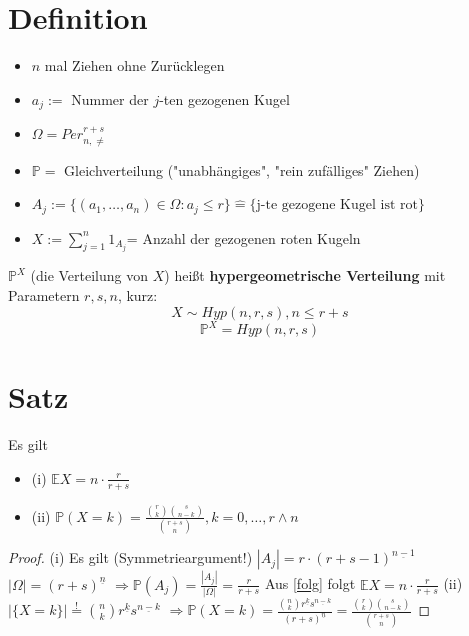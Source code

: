 \documentclass[a4paper,11pt,notitlepage]{report}
\newcommand{\Prim}{{\ensuremath{\mathbb{P}}}}
\newcommand{\E}{{\ensuremath{\mathbb{E}}}}
\begin{document}
\section{Definition}
\begin{itemize}
	\item $n$ mal Ziehen ohne Zurücklegen
	\item $a_j :=$ Nummer der $j$-ten gezogenen Kugel
	\item $\Omega = Per_{n,\neq}^{r+s}$
	\item $\Prim =$ Gleichverteilung ("unabhängiges", "rein zufälliges" Ziehen)
	\item $A_j := \{(a_1,\ldots,a_n) \in \Omega \colon a_j \leq r\} \hat{=} \{\text{j-te gezogene Kugel ist rot}\}$
	\item $X:= \sum\limits_{j=1}^{n}{1_{A_j}}$= Anzahl der gezogenen roten Kugeln
\end{itemize}
$\Prim^X$ (die Verteilung von $X$) heißt \textbf{hypergeometrische Verteilung} mit Parametern $r,s,n$, kurz:
$$X \sim Hyp(n,r,s), n \leq r+s$$
$$\Prim^X = Hyp(n,r,s)$$

\section{Satz}
Es gilt
\begin{itemize}
	\item (i) $\E X = n \cdot \frac{r}{r+s}$
	\item (ii) $\Prim(X=k) = \frac{{r \choose k}{s \choose {n-k}}}{{{r+s} \choose {n}}}, k = 0, \ldots, r \wedge n$
\end{itemize}

\begin{proof}
	(i) Es gilt (Symmetrieargument!) $|A_j| = r \cdot (r+s-1)^{\underline{n-1}}$
	\newline
	$|\Omega| = (r+s)^{\underline{n}}$
	$\Rightarrow \Prim(A_j) = \frac{|A_j|}{|\Omega|} = \frac{r}{r+s}$
	\newline
	Aus \ref{folg} folgt $\E X = n \cdot \frac{r}{r+s}$
	\newline
	(ii) $|\{X=k\}| \overset{!}{=} {n \choose k} r^{\underline{k}} s^{\underline{n-k}}$
	\newline
	$\Rightarrow \Prim(X=k) = \frac{{n \choose k} r^{\underline{k}} s^{\underline{n-k}}}{(r+s)^{\underline{n}}} = \frac{{r \choose k}{s \choose {n-k}}}{{{r+s}\choose n}}$
\end{proof}
\end{document}
